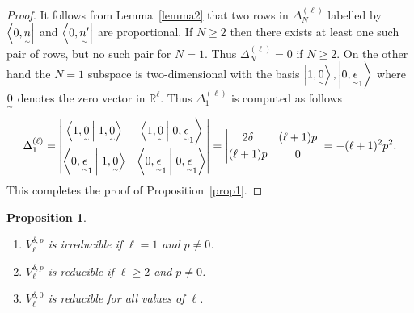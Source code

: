 \documentclass[11pt]{article}
\numberwithin{equation}{section}
\newcommand{\underaccent}[2]{\mathord{\underset{\smash{\scriptscriptstyle\sim}}{#2}}}
\newtheorem{proposition}{Proposition}
\def\bra#1{\left\langle #1\right|}
\def\ket#1{\left| #1\right\rangle}
\def\bracket#1#2{\left\langle #1  \,\right| \left. #2 \right\rangle}
\begin{document}
\begin{proof}
It follows from Lemma~\ref{lemma2} that two rows in $ \Delta^{(\ell)}_N $ labelled by $ \bra{0,\underaccent{\tilde}{n}}
$ and $ \bra{0,\underaccent{\tilde}{n'}} $ are proportional.
If $ N \geq 2 $ then there exists at least one such pair of rows, but no such pair for $N = 1$.
Thus $ \Delta^{(\ell)}_N = 0 $ if $ N \geq 2$.
On the other hand the $ N = 1 $ subspace is two-dimensional with the basis $ \ket{1, \underaccent{\tilde}{0}}, \ket{0,
\underaccent{\tilde}{\epsilon}_1} $ where $\underaccent{\tilde}{0}$ denotes the zero vector in ${\mathbb R}^{\ell}$.
Thus $ \Delta^{(\ell)}_1 $ is computed as follows
\begin{gather*}
\Delta^{(\ell)}_1 = \left|
\begin{matrix} \bracket{1, \underaccent{\tilde}{0}}{1, \underaccent{\tilde}{0}} & \bracket{1, \underaccent{\tilde}{0}}{0,
\underaccent{\tilde}{\epsilon}_1}
\vspace{1mm}\\  \bracket{0, \underaccent{\tilde}{\epsilon}_1}{1, \underaccent{\tilde}{0}} & \bracket{0,
\underaccent{\tilde}{\epsilon}_1}{0, \underaccent{\tilde}{\epsilon}_1}
\end{matrix}
\right| = \left|
\begin{matrix} 2 \delta & (\ell+1)p
\vspace{1mm}\\  (\ell+1)p & 0
\end{matrix}
\right| = - (\ell+1)^2   p^2   .
\end{gather*}
This completes the proof of Proposition~\ref{prop1}.
\end{proof}



\begin{proposition}\qquad
\label{prop2}
\begin{enumerate}\itemsep=0pt
\item[$i)$] $ V^{\delta,p}_{\ell} $ is irreducible if $ \ell = 1 $ and $ p \neq 0$.
\item[$ii)$] $ V^{\delta,p}_{\ell} $ is reducible if $ \ell \geq 2 $ and $ p \neq 0$.
\item[$iii)$] $ V^{\delta,0}_{\ell} $ is reducible for all values of $ \ell$.
\end{enumerate}
\end{proposition}
\end{document}
